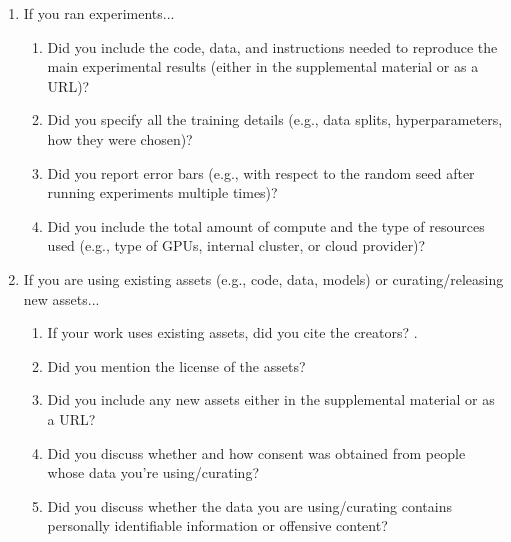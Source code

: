 \begin{enumerate}
\item If you ran experiments...
\begin{enumerate}
  \item Did you include the code, data, and instructions needed to reproduce the main experimental results (either in the supplemental material or as a URL)?
  \item Did you specify all the training details (e.g., data splits, hyperparameters, how they were chosen)?
	\item Did you report error bars (e.g., with respect to the random seed after running experiments multiple times)?
	\item Did you include the total amount of compute and the type of resources used (e.g., type of GPUs, internal cluster, or cloud provider)?
\end{enumerate}

\item If you are using existing assets (e.g., code, data, models) or curating/releasing new assets...
\begin{enumerate}
  \item If your work uses existing assets, did you cite the creators?
    .
  \item Did you mention the license of the assets?
  \item Did you include any new assets either in the supplemental material or as a URL?
  \item Did you discuss whether and how consent was obtained from people whose data you're using/curating?
  \item Did you discuss whether the data you are using/curating contains personally identifiable information or offensive content?
\end{enumerate}


\end{enumerate}
